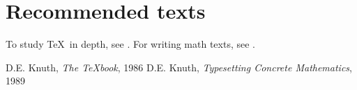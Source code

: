 \documentclass{article}
\begin{document}
\section*{Recommended texts}
To study \TeX\ in depth, see \cite{DK86}. For writing math texts, see \cite{DK89}.
\begin{thebibliography}{8}
 D.E. Knuth, \emph{The {\TeX}book}, 1986
 D.E. Knuth, \emph{Typesetting Concrete Mathematics}, 1989
\end{thebibliography}
\end{document}
